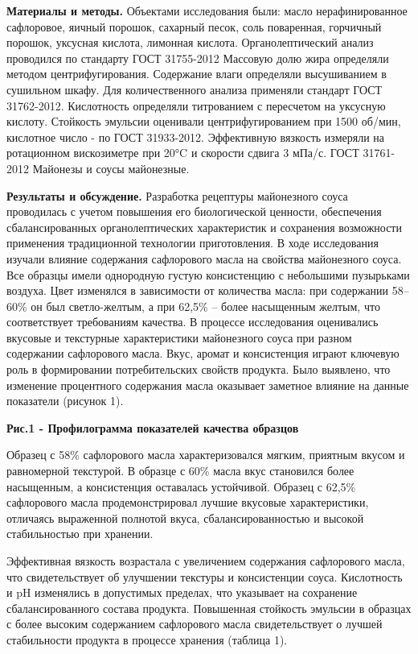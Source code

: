 \begin{multicols}{2}
{\bfseries Материалы и методы.} Объектами исследования были: масло
нерафинированное сафлоровое, яичный порошок, сахарный песок, соль
поваренная, горчичный порошок, уксусная кислота, лимонная кислота.
Органолептический анализ проводился по стандарту ГОСТ 31755-2012
Массовую долю жира определяли методом центрифугирования. Содержание
влаги определяли высушиванием в сушильном шкафу. Для количественного
анализа применяли стандарт ГОСТ 31762-2012. Кислотность определяли
титрованием с пересчетом на уксусную кислоту. Стойкость эмульсии
оценивали центрифугированием при 1500 об/мин, кислотное число - по ГОСТ
31933-2012. Эффективную вязкость измеряли на ротационном вискозиметре
при 20°C и скорости сдвига 3 мПа/с. ГОСТ 31761- 2012 Майонезы и соусы
майонезные.

{\bfseries Результаты и обсуждение.} Разработка рецептуры майонезного соуса
проводилась с учетом повышения его биологической ценности, обеспечения
сбалансированных органолептических характеристик и сохранения
возможности применения традиционной технологии приготовления. В ходе
исследования изучали влияние содержания сафлорового масла на свойства
майонезного соуса. Все образцы имели однородную густую консистенцию с
небольшими пузырьками воздуха. Цвет изменялся в зависимости от
количества масла: при содержании 58--60\% он был светло-желтым, а при
62,5\% -- более насыщенным желтым, что соответствует требованиям
качества. В процессе исследования оценивались вкусовые и текстурные
характеристики майонезного соуса при разном содержании сафлорового
масла. Вкус, аромат и консистенция играют ключевую роль в формировании
потребительских свойств продукта. Было выявлено, что изменение
процентного содержания масла оказывает заметное влияние на данные
показатели (рисунок 1).
\end{multicols}

{\bfseries Рис.1 - Профилограмма показателей качества образцов}

\begin{multicols}{2}
Образец с 58\% сафлорового масла характеризовался мягким, приятным
вкусом и равномерной текстурой. В образце с 60\% масла вкус становился
более насыщенным, а консистенция оставалась устойчивой. Образец с 62,5\%
сафлорового масла продемонстрировал лучшие вкусовые характеристики,
отличаясь выраженной полнотой вкуса, сбалансированностью и высокой
стабильностью при хранении.

Эффективная вязкость возрастала с увеличением содержания сафлорового
масла, что свидетельствует об улучшении текстуры и консистенции соуса.
Кислотность и pH изменялись в допустимых пределах, что указывает на
сохранение сбалансированного состава продукта. Повышенная стойкость
эмульсии в образцах с более высоким содержанием сафлорового масла
свидетельствует о лучшей стабильности продукта в процессе хранения
(таблица 1).
\end{multicols}

